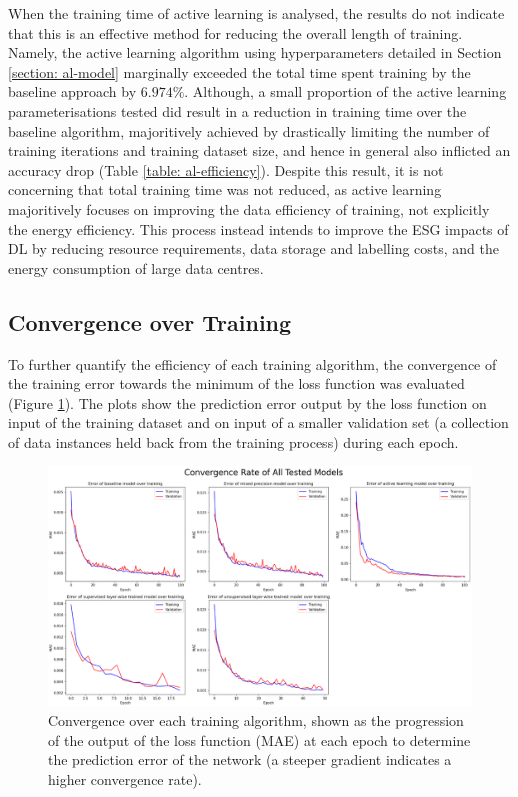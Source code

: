 \documentclass[a4paper, 11pt]{report}
\begin{document}
    When the training time of active learning is analysed, the results do not indicate that this is an effective method for reducing the overall length of training. Namely, the active learning algorithm using hyperparameters detailed in Section \ref{section: al-model} marginally exceeded the total time spent training by the baseline approach by $6.974\%$. Although, a small proportion of the active learning parameterisations tested did result in a reduction in training time over the baseline algorithm, majoritively achieved by drastically limiting the number of training iterations and training dataset size, and hence in general also inflicted an accuracy drop (Table \ref{table: al-efficiency}). Despite this result, it is not concerning that total training time was not reduced, as active learning majoritively focuses on improving the data efficiency of training, not explicitly the energy efficiency. This process instead intends to improve the ESG impacts of DL by reducing resource requirements, data storage and labelling costs, and the energy consumption of large data centres.



    \subsection{Convergence over Training}

    To further quantify the efficiency of each training algorithm, the convergence of the training error towards the minimum of the loss function was evaluated (Figure \ref{fig: convergence}). The plots show the prediction error output by the loss function on input of the training dataset and on input of a smaller validation set (a collection of data instances held back from the training process) during each epoch.


    \begin{figure}[ht!]
        \centering
        \includegraphics[width=\textwidth]{results/all-training-loss.png}
        \caption{\centering Convergence over each training algorithm, shown as the progression of the output of the loss function (MAE) at each epoch to determine the prediction error of the network (a steeper gradient indicates a higher convergence rate).}
        \label{fig: convergence}
    \end{figure}
\end{document}
